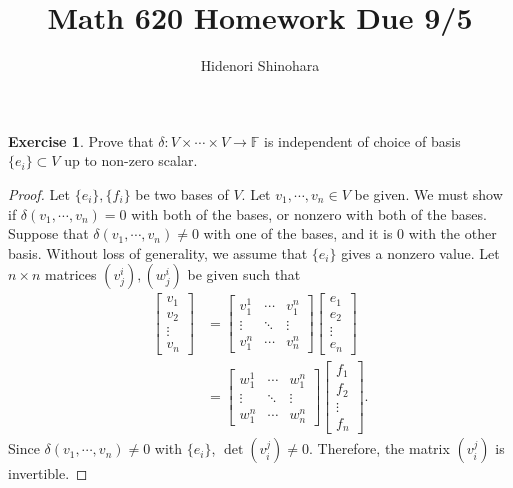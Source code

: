 \documentclass[12pt, psamsfonts]{amsart}
\theoremstyle{definition}
\newtheorem{exer}[thm]{Exercise}
\theoremstyle{remark}
\numberwithin{equation}{section}
\begin{document}
\title{Math 620 Homework Due 9/5}
\author{Hidenori Shinohara}
\maketitle

\begin{exer}
  Prove that $\delta: V \times \cdots \times V \rightarrow \mathbb{F}$ is independent of choice of basis $\{ e_i \} \subset V$ up to non-zero scalar.
\end{exer}

\begin{proof}
  Let $\{ e_i \}, \{ f_i \}$ be two bases of $V$.
  Let $v_1, \cdots, v_n \in V$ be given.
  We must show if $\delta(v_1, \cdots, v_n) = 0$ with both of the bases, or nonzero with both of the bases.
  Suppose that $\delta(v_1, \cdots, v_n) \ne 0$ with one of the bases, and it is $0$ with the other basis.
  Without loss of generality, we assume that $\{ e_i \}$ gives a nonzero value.
  Let $n \times n$ matrices $(v^i_j), (w^i_j)$ be given such that
  \begin{align*}
    \begin{bmatrix} v_1 \\ v_2 \\ \vdots \\ v_n \end{bmatrix}
      &= \begin{bmatrix} v^1_1 & \cdots & v^n_1 \\ \vdots & \ddots & \vdots \\ v^n_1 & \cdots & v^n_n \end{bmatrix}
         \begin{bmatrix} e_1 \\ e_2 \\ \vdots \\ e_n \end{bmatrix} \\
      &= \begin{bmatrix} w^1_1 & \cdots & w^n_1 \\ \vdots & \ddots & \vdots \\ w^n_1 & \cdots & w^n_n \end{bmatrix}
         \begin{bmatrix} f_1 \\ f_2 \\ \vdots \\ f_n \end{bmatrix}.
  \end{align*}
  Since $\delta(v_1, \cdots, v_n) \ne 0$ with $\{ e_i \}$, $\det(v_i^j) \ne 0$.
  Therefore, the matrix $(v_i^j)$ is invertible.


\end{proof}
\end{document}
